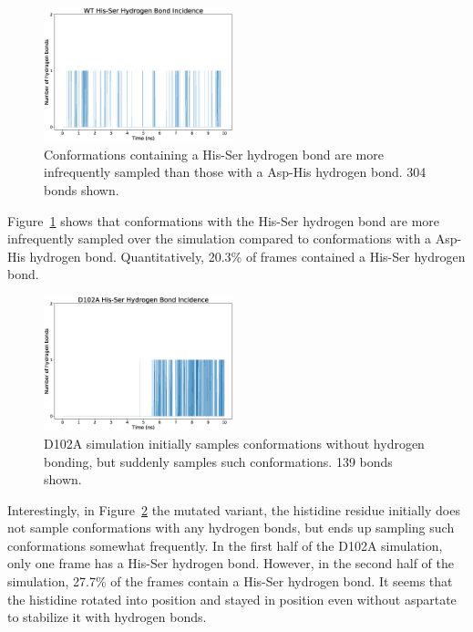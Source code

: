 \documentclass[11pt, twocolumn]{article}
\begin{document}
\begin{figure}[H]
    \centering
        \includegraphics[width=0.49\textwidth]{wt_hbonds_his_ser.eps}
    \caption{Conformations containing a His-Ser hydrogen bond are
        more infrequently sampled than those with a Asp-His
        hydrogen bond. 304 bonds shown.
        }\label{fig:hbond_his_ser_wt}
\end{figure}

Figure~\ref{fig:hbond_his_ser_wt} shows that conformations with the His-Ser
hydrogen bond are more infrequently sampled over the simulation compared to
conformations with a Asp-His hydrogen bond. Quantitatively, 20.3\% of frames
contained a His-Ser hydrogen bond.

\begin{figure}[H]
    \centering
        \includegraphics[width=0.49\textwidth]{d102a_hbonds_his_ser.eps}
    \caption{D102A simulation initially samples conformations without hydrogen
        bonding, but suddenly samples such conformations. 139 bonds shown.
        }\label{fig:hbond_his_ser_d102a}
\end{figure}


Interestingly, in
Figure~\ref{fig:hbond_his_ser_d102a} the mutated variant, the histidine
residue initially does not sample conformations with any hydrogen bonds, but
ends up sampling such conformations somewhat frequently. In the first half
of the D102A simulation, only one frame has a His-Ser hydrogen bond. However,
in the second half of the simulation, 27.7\% of the frames contain a His-Ser
hydrogen bond. It seems that the histidine rotated into position and stayed
in position even without aspartate to stabilize it with hydrogen bonds.
\end{document}
